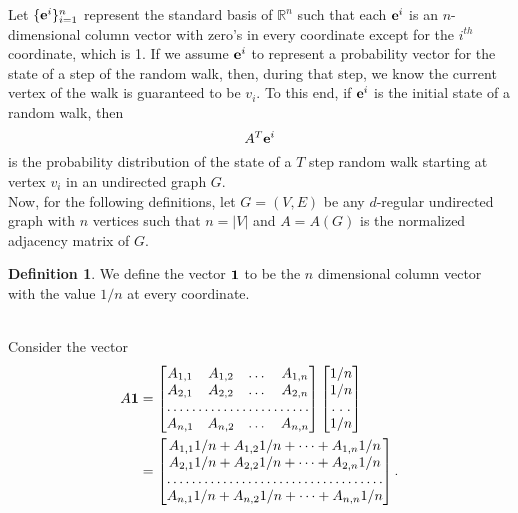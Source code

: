 \documentclass[psamsfonts, 10pt]{amsart}
\theoremstyle{definition}
\newtheorem{defn}[thm]{Definition}
\theoremstyle{remark}
\numberwithin{equation}{section}
\newcommand{\creturn}{\mbox{}\\}
\begin{document}
Let $\{{\bf e}^i\}_{i=1}^n$ represent the standard basis of $\mathbb{R}^n$ such that each ${\bf e}^i$ is an $n$-dimensional column vector with zero's in every coordinate except for the $i^{th}$ coordinate, which is 1. If we assume ${\bf e}^i$ to represent a probability vector for the state of a step of the random walk, then, during that step, we know the current vertex of the walk is guaranteed to be $v_i$. To this end, if ${\bf e}^i$ is the initial state of a random walk, then
\begin{equation}
A^T{\bf e}^i
\end{equation}
is the probability distribution of the state of a $T$ step random walk starting at vertex $v_i$ in an undirected graph $G$.\\

Now, for the following definitions, let $G = (V,E)$ be any $d$-regular undirected graph with $n$ vertices such that $n = \lvert V \rvert$ and  $A = A(G)$ is the normalized adjacency matrix of $G$. 
\begin{defn}
We define the vector ${\bf 1}$ to be the $n$ dimensional column vector with the value $1/n$ at every coordinate.
\end{defn}\creturn
Consider the vector 
\[
\begin{aligned}
A{\bf 1} &= \begin{bmatrix}
    A_{1,1}    &  A_{1,2}  & \dots &  A_{1,n}  \\
   A_{2,1}       &  A_{2,2}   & \dots &  A_{2,n}   \\
    \hdotsfor{4} \\
     A_{n,1}        & A_{n,2}  & \dots &  A_{n,n} 
\end{bmatrix}
\begin{bmatrix}
    1/n \\
   1/n \\
    \hdotsfor{1} \\
     1/n \\
\end{bmatrix}\\
&= 
\begin{bmatrix}
    A_{1,1}1/n + A_{1,2}1/n + \dots + A_{1,n}1/n \\
    A_{2,1}1/n + A_{2,2}1/n + \dots + A_{2,n}1/n \\
    \hdotsfor{1} \\
      A_{n,1}1/n + A_{n,2}1/n + \dots + A_{n,n}1/n \\
\end{bmatrix}.
\end{aligned}
\]
\end{document}
